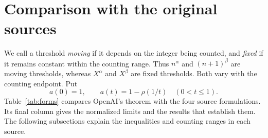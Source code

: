 \documentclass[11pt,a4paper]{amsart}
\begin{document}
\section{Comparison with the original sources}\label{sec:sources}

We call a threshold \emph{moving} if it depends on the integer being
counted, and \emph{fixed} if it remains constant within the counting
range. Thus $n^\alpha$ and $(n+1)^\beta$ are moving thresholds, whereas
$X^\alpha$ and $X^\beta$ are fixed thresholds. Both vary with the
counting endpoint. Put
\[
 a(0)=1,\qquad a(t)=1-\rho(1/t)\quad(0<t\le1).
\]
Table~\ref{tab:forms} compares OpenAI's theorem with the four source
formulations. Its final column gives the normalized limits and the
results that establish them. The following subsections explain the
inequalities and counting ranges in each source.
\end{document}
